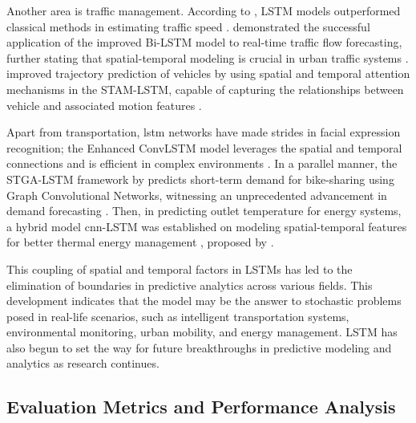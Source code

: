 \begin{refsection}
Another area is traffic management. According to \citeauthor{thirty} \citeyear{thirty}, LSTM models outperformed classical methods in estimating traffic speed \cite{thirty}. \citeauthor{thirtyone} \citeyear{thirtyone} demonstrated the successful application of the improved Bi-LSTM model to real-time traffic flow forecasting, further stating that spatial-temporal modeling is crucial in urban traffic systems \cite{thirtyone}. \citeauthor{thirtytwo} \citeyear{thirtytwo} improved trajectory prediction of vehicles by using spatial and temporal attention mechanisms in the STAM-LSTM, capable of capturing the relationships between vehicle and associated motion features \cite{thirtytwo}.

Apart from transportation, \gls{lstm} networks have made strides in facial expression recognition; the Enhanced ConvLSTM model leverages the spatial and temporal connections and is efficient in complex environments \cite{thirtythree}. In a parallel manner, the STGA-LSTM framework by \citeauthor{thirtyfour} predicts short-term demand for bike-sharing using Graph Convolutional Networks, witnessing an unprecedented advancement in demand forecasting \cite{thirtyfour}. Then, in predicting outlet temperature for energy systems, a hybrid model \gls{cnn}-LSTM was established on modeling spatial-temporal features for better thermal energy management \cite{thirtyfive}, proposed by \citeauthor{thirtyfive} \citeyear{thirtyfive}.

This coupling of spatial and temporal factors in LSTMs has led to the elimination of boundaries in predictive analytics across various fields. This development indicates that the model may be the answer to stochastic problems posed in real-life scenarios, such as intelligent transportation systems, environmental monitoring, urban mobility, and energy management. LSTM has also begun to set the way for future breakthroughs in predictive modeling and analytics as research continues.

\subsection{Evaluation Metrics and Performance Analysis}


\end{refsection}
